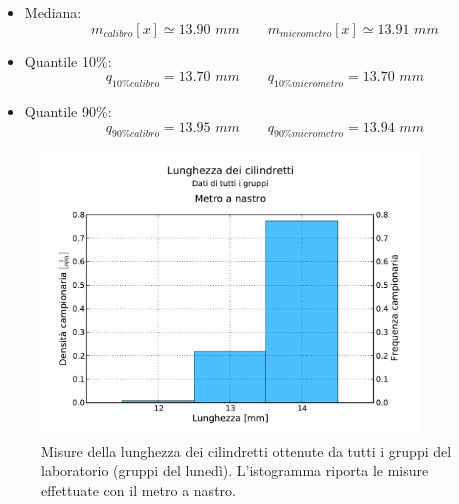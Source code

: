 \begin{itemize}
    \item{Mediana:}
        \begin{equation}
        m_{calibro}[x] \simeq 13.90\,\,mm \qquad
        m_{micrometro}[x] \simeq 13.91\,\,mm 
        \end{equation}

    \item{Quantile 10\%:}
        \begin{equation}
        q_{10\%calibro} = 13.70\,\,mm \qquad
        q_{10\%micrometro} = 13.70\,\,mm
        \end{equation}

    \item{Quantile 90\%:}
        \begin{equation}
        q_{90\%calibro} = 13.95\,\,mm \qquad
        q_{90\%micrometro} = 13.94\,\,mm
        \end{equation}
\end{itemize}

\begin{figure}
	\centering
	\includegraphics[width=100mm]{grafici/cilindri_tutti.pdf}
	\caption{Misure della lunghezza dei cilindretti ottenute da tutti i gruppi del
        laboratorio (gruppi del lunedì). L'istogramma riporta le misure effettuate con
        il metro a nastro.}
\end{figure}

